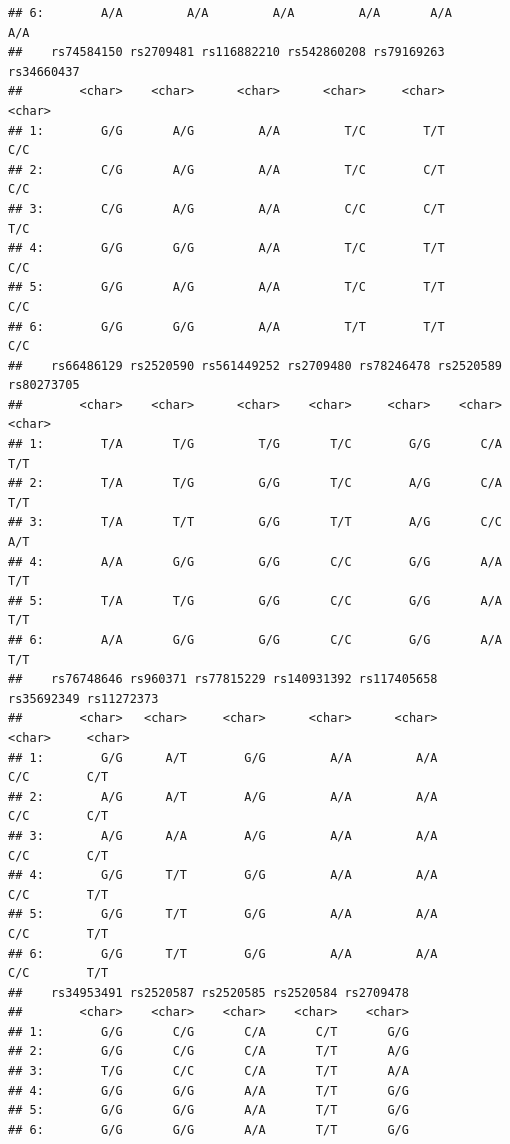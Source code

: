 \documentclass[
]{article}
\begin{document}
\begin{verbatim}
## 6:        A/A         A/A         A/A         A/A       A/A       A/A
##    rs74584150 rs2709481 rs116882210 rs542860208 rs79169263 rs34660437
##        <char>    <char>      <char>      <char>     <char>     <char>
## 1:        G/G       A/G         A/A         T/C        T/T        C/C
## 2:        C/G       A/G         A/A         T/C        C/T        C/C
## 3:        C/G       A/G         A/A         C/C        C/T        T/C
## 4:        G/G       G/G         A/A         T/C        T/T        C/C
## 5:        G/G       A/G         A/A         T/C        T/T        C/C
## 6:        G/G       G/G         A/A         T/T        T/T        C/C
##    rs66486129 rs2520590 rs561449252 rs2709480 rs78246478 rs2520589 rs80273705
##        <char>    <char>      <char>    <char>     <char>    <char>     <char>
## 1:        T/A       T/G         T/G       T/C        G/G       C/A        T/T
## 2:        T/A       T/G         G/G       T/C        A/G       C/A        T/T
## 3:        T/A       T/T         G/G       T/T        A/G       C/C        A/T
## 4:        A/A       G/G         G/G       C/C        G/G       A/A        T/T
## 5:        T/A       T/G         G/G       C/C        G/G       A/A        T/T
## 6:        A/A       G/G         G/G       C/C        G/G       A/A        T/T
##    rs76748646 rs960371 rs77815229 rs140931392 rs117405658 rs35692349 rs11272373
##        <char>   <char>     <char>      <char>      <char>     <char>     <char>
## 1:        G/G      A/T        G/G         A/A         A/A        C/C        C/T
## 2:        A/G      A/T        A/G         A/A         A/A        C/C        C/T
## 3:        A/G      A/A        A/G         A/A         A/A        C/C        C/T
## 4:        G/G      T/T        G/G         A/A         A/A        C/C        T/T
## 5:        G/G      T/T        G/G         A/A         A/A        C/C        T/T
## 6:        G/G      T/T        G/G         A/A         A/A        C/C        T/T
##    rs34953491 rs2520587 rs2520585 rs2520584 rs2709478
##        <char>    <char>    <char>    <char>    <char>
## 1:        G/G       C/G       C/A       C/T       G/G
## 2:        G/G       C/G       C/A       T/T       A/G
## 3:        T/G       C/C       C/A       T/T       A/A
## 4:        G/G       G/G       A/A       T/T       G/G
## 5:        G/G       G/G       A/A       T/T       G/G
## 6:        G/G       G/G       A/A       T/T       G/G
\end{verbatim}
\end{document}
